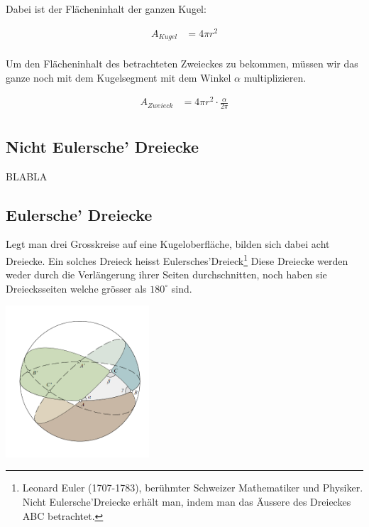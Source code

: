 \begin{refsection}
Dabei ist der Flächeninhalt der ganzen Kugel:

\begin{align*}
A_{ Kugel } &= 4 \pi r^{2}\\
\end{align*}


Um den Flächeninhalt des betrachteten Zweieckes zu bekommen, 
müssen wir das ganze noch mit dem Kugelsegment mit dem Winkel $\alpha$ multiplizieren.

\begin{align*}
A_{ Zweieck } &= 4 \pi r^{2} \cdot \frac{ \alpha }{ 2 \pi }\\
\end{align*}


\subsection{Nicht Eulersche’ Dreiecke}

BLABLA

\subsection{Eulersche’ Dreiecke}

Legt man drei Grosskreise auf eine Kugeloberfläche, bilden sich dabei acht Dreiecke. 
Ein solches Dreieck heisst Eulersches’Dreieck\footnote{%
Leonard Euler (1707-1783), berühmter Schweizer Mathematiker und Physiker. 
Nicht Eulersche’Dreiecke erhält man, indem man das Äussere des Dreieckes ABC betrachtet.} 
Diese Dreiecke werden weder durch die Verlängerung ihrer Seiten durchschnitten, 
noch haben sie Dreiecksseiten welche grösser als $180^{\circ}$ sind.

\begin{center}
        \includegraphics[width=0.4\textwidth]{kugel/Zweiecke.jpg}
\end{center}


\end{refsection}
